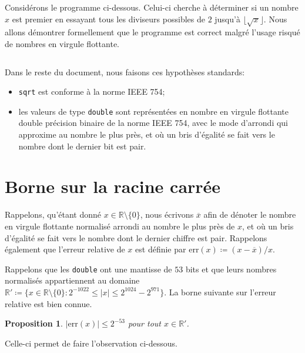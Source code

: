 \documentclass{article}
\newenvironment{code}{
  \smallskip\begin{tcolorbox}[colback=lightgray!8, breakable, sharp corners, before upper={\parindent15pt}, parbox=false, left=0pt, right=0pt, top=-1pt, bottom=-2pt, boxrule=0.75pt, enhanced, colframe=black!25]\vspace*{-4pt}
}{\vspace*{-5pt}\end{tcolorbox}\smallskip
}
\newcommand{\R}{\mathbb{R}}
\newcommand{\defeq}{\coloneqq}
\newtheorem{proposition}[theorem]{Proposition}
\begin{document}
Considérons le programme ci-dessous. Celui-ci cherche à déterminer si
un nombre $x$ est premier en essayant tous les diviseurs possibles de
$2$ jusqu'à $\lfloor \sqrt{x} \rfloor$. Nous allons démontrer
formellement que le programme est correct malgré l'usage risqué de
nombres en virgule flottante.

\begin{code}
  \inputminted{cpp}{code.cpp}
\end{code}

Dans le reste du document, nous faisons ces hypothèses standards:

\smallskip
\begin{itemize}
  \setlength\itemsep{3pt}

\item \og \texttt{sqrt} \fg{} est conforme à la norme
  IEEE 754;

\item les valeurs de type \texttt{double} sont représentées
  en nombre en virgule flottante double précision binaire de la norme
  IEEE 754, avec le mode d'arrondi qui approxime au nombre le plus
  près, et où un bris d'égalité se fait vers le nombre dont le dernier
  bit est pair.
\end{itemize}

\section{Borne sur la racine carrée}

Rappelons, qu'étant donné $x \in \R \setminus \{0\}$, nous écrivons
$\overline{x}$ afin de dénoter le nombre en virgule flottante
normalisé arrondi au nombre le plus près de $x$, et où un bris
d'égalité se fait vers le nombre dont le dernier chiffre est
pair. Rappelons également que l'erreur relative de $x$ est définie par
$\mathrm{err}(x) \defeq (x - \overline{x}) / x$.

Rappelons que les \texttt{double} ont une mantisse de $53$
bits et que leurs nombres normalisés appartiennent au domaine $\R'
\defeq \{x \in \R \setminus \{0\} : 2^{-1022} \leq |x| \leq 2^{1024} -
2^{971}\}$. La borne suivante sur l'erreur relative est bien connue.

\begin{proposition}\label{prop:err}
  $|\mathrm{err}(x)| \leq 2^{-53}$ pour tout $x \in \R'$.
\end{proposition}

Celle-ci permet de faire l'observation ci-dessous.
\end{document}
